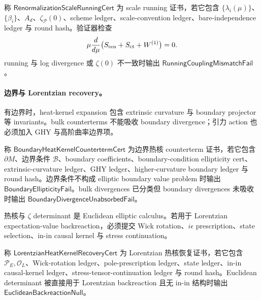 \begin{definition}\label{def:typed-address-biaxial-completion-renormalization-scale-running-cert}
称 \(\mathsf{RenormalizationScaleRunningCert}\) 为 scale running 证书，若它包含 \(\{\lambda_i(\mu)\}\)、\(\{\beta_i\}\)、\(A_d\)、\(\zeta_{\mathcal P}(0)\)、scheme ledger、scale-convention ledger、bare-independence ledger 与 round hash。验证器检查
\[
\mu\frac{d}{d\mu}
\bigl(S_{\rm ren}+S_{\rm ct}+W^{(1)}\bigr)=0.
\]
running 与 log divergence 或 \(\zeta(0)\) 不一致时输出 \(\mathsf{RunningCouplingMismatchFail}\)。
\end{definition}

\paragraph{边界与 Lorentzian recovery。}
有边界时，heat-kernel expansion 包含 extrinsic curvature 与 boundary projector 等 invariants。bulk counterterms 不能吸收 boundary divergence；引力 action 也必须加入 GHY 与高阶曲率边界项。

\begin{definition}\label{def:typed-address-biaxial-completion-boundary-heat-kernel-counterterm-cert}
称 \(\mathsf{BoundaryHeatKernelCountertermCert}\) 为边界热核 counterterm 证书，若它包含 \(\partial M\)、边界条件 \(\mathcal B\)、boundary coefficients、boundary-condition ellipticity cert、extrinsic-curvature ledger、GHY ledger、higher-curvature boundary ledger 与 round hash。边界条件不构成 elliptic boundary value problem 时输出 \(\mathsf{BoundaryEllipticityFail}\)。bulk divergences 已分类但 boundary divergences 未吸收时输出 \(\mathsf{BoundaryDivergenceUnabsorbedFail}\)。
\end{definition}

热核与 \(\zeta\) determinant 是 Euclidean elliptic calculus。若用于 Lorentzian expectation-value backreaction，必须提交 Wick rotation、\(i\epsilon\) prescription、state selection、in-in causal kernel 与 stress continuation。

\begin{definition}\label{def:typed-address-biaxial-completion-lorentzian-heat-kernel-recovery-cert}
称 \(\mathsf{LorentzianHeatKernelRecoveryCert}\) 为 Lorentzian 热核恢复证书，若它包含 \(\mathcal P_E,\mathcal O_L\)、Wick-rotation ledger、pole-prescription ledger、state ledger、in-in causal-kernel ledger、stress-tensor-continuation ledger 与 round hash。Euclidean determinant 被直接用于 Lorentzian backreaction 且无 in-in 结构时输出 \(\mathsf{EuclideanBackreactionNull}\)。
\end{definition}

